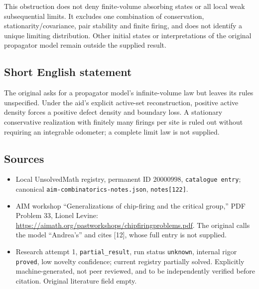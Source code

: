 \documentclass[11pt]{article}
\begin{document}
This obstruction does not deny finite-volume absorbing states or all local weak subsequential limits. It excludes one combination of conservation, stationarity/covariance, pair stability and finite firing, and does not identify a unique limiting distribution. Other initial states or interpretations of the original propagator model remain outside the supplied result.
\subsection{Short English statement}
The original asks for a propagator model's infinite-volume law but leaves its rules unspecified. Under the aid's explicit active-set reconstruction, positive active density forces a positive defect density and boundary loss. A stationary conservative realization with finitely many firings per site is ruled out without requiring an integrable odometer; a complete limit law is not supplied.
\subsection{Sources}
\begin{itemize}
\item Local UnsolvedMath registry, permanent ID $20000998$, \texttt{catalogue entry}; canonical \texttt{aim-combinatorics-notes.json}, \texttt{notes[122]}.
\item AIM workshop ``Generalizations of chip-firing and the critical group,'' PDF Problem 33, Lionel Levine: \url{https://aimath.org/pastworkshops/chipfiringproblems.pdf}. The original calls the model ``Andrea's'' and cites [12], whose full entry is not supplied.
\item Research attempt 1, \texttt{partial\_result}, run status \texttt{unknown}, internal rigor \texttt{proved}, low novelty confidence; current registry partially solved. Explicitly machine-generated, not peer reviewed, and to be independently verified before citation. Original literature field empty.
\end{itemize}
\end{document}
